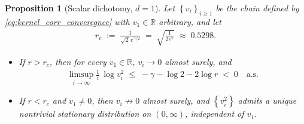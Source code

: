 \documentclass{article}
\newcommand{\RR}{\mathbb{R}}
\newcommand{\Set}[1]{\left\{ #1 \right\}}
\newtheorem{proposition}[theorem]{Proposition}
\begin{document}
\begin{proposition}[Scalar dichotomy, $d = 1$]
  \label{prop:sync_v_convergence}
  Let $\Set{v_i}_{i \ge 1}$ be the chain defined by \eqref{eq:kernel_corr_converegnce} with $v_1 \in \RR$ arbitrary, and let
  \begin{eqnarray*}
    r_c \;:=\; \frac{1}{\sqrt{2}\, e^{\gamma/2}} \;=\; \sqrt{\frac{1}{2 e^\gamma}} \;\approx\; 0.5298.
  \end{eqnarray*}
  \begin{itemize}
    \item[(i)] If $r > r_c$, then for every $v_1 \in \RR$, $v_i \to 0$ almost surely, and
      \begin{eqnarray*}
        \limsup_{i \to \infty} \frac{1}{i}\, \log v_i^2 \;\le\; -\gamma - \log 2 - 2\log r \;<\; 0 \quad \text{a.s.}
      \end{eqnarray*}
    \item[(ii)] If $r < r_c$ and $v_1 \ne 0$, then $v_i \not\to 0$ almost surely, and $\Set{v_i^2}$ admits a unique nontrivial stationary distribution on $(0, \infty)$, independent of $v_1$.
  \end{itemize}
\end{proposition}
\end{document}
